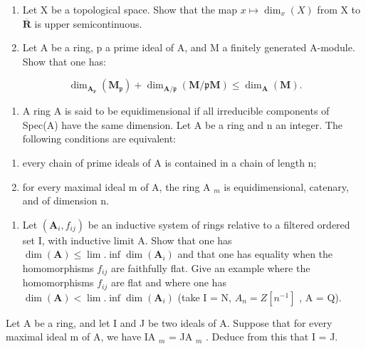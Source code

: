 \begin{enumerate}
\def\labelenumi{\arabic{enumi})}
\setcounter{enumi}{7}
\item
  Let X be a topological space. Show that the map \(x \mapsto \dim_x(X)\) from X to \(\overline{\mathbf{R}}\) is upper semicontinuous.
\item
  Let A be a ring, p a prime ideal of A, and M a finitely generated A-module. Show that one has:
\end{enumerate}

\[
\dim_ {\mathbf {A} _ {\mathfrak {p}}} (\mathbf {M} _ {\mathfrak {p}}) + \dim_ {\mathbf {A} / \mathfrak {p}} (\mathbf {M} / \mathfrak {p} \mathbf {M}) \leqslant \dim_ {\mathbf {A}} (\mathbf {M}).
\]

\begin{enumerate}
\def\labelenumi{\arabic{enumi})}
\setcounter{enumi}{9}
\tightlist
\item
  A ring A is said to be equidimensional if all irreducible components of Spec(A) have the same dimension. Let A be a ring and n an integer. The following conditions are equivalent:
\end{enumerate}

\begin{enumerate}
\def\labelenumi{\alph{enumi})}
\tightlist
\item
  every chain of prime ideals of A is contained in a chain of length n;
\item
  for every maximal ideal m of A, the ring A \(_{m}\) is equidimensional, catenary, and of dimension n.
\end{enumerate}

\begin{enumerate}
\def\labelenumi{\arabic{enumi})}
\setcounter{enumi}{10}
\tightlist
\item
  Let \((\mathbf{A}_{i}, f_{ij})\) be an inductive system of rings relative to a filtered ordered set I, with inductive limit A. Show that one has \(\dim(\mathbf{A}) \leqslant \lim.\inf\dim(\mathbf{A}_{i})\) and that one has equality when the homomorphisms \(f_{ij}\) are faithfully flat. Give an example where the homomorphisms \(f_{ij}\) are flat and where one has \(\dim(\mathbf{A}) < \lim.\inf\dim(\mathbf{A}_{i})\) (take I = N, \(A_{n} = Z[n^{-1}]\) , A = Q).
\end{enumerate}

Let A be a ring, and let I and J be two ideals of A. Suppose that for every maximal ideal m of A, we have IA \(_{m}\) = JA \(_{m}\) . Deduce from this that I = J.

